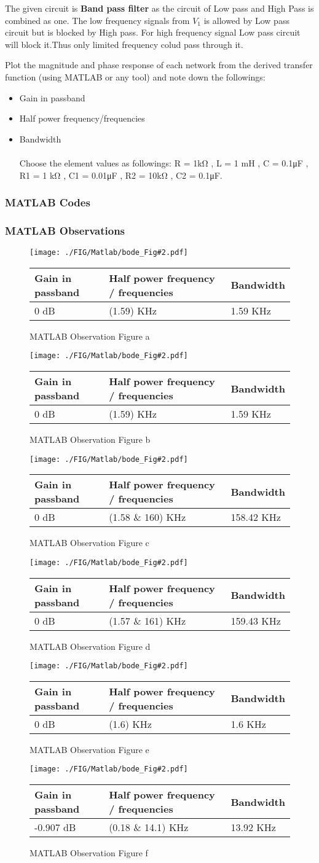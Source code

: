 \documentclass[a4paper,11pt]{article}
\newcommand{\mobs}[5]{
    \begin{figure}[H]
        \centering
        \texttt{[image: ./FIG/Matlab/bode\_Fig\#2.pdf]}
        \begin{tabular}[H]{| m{12em}| m{20em}|m{8em}|}
            \hline
            \rowcolor[rgb]{0.569,0.647,0.947} \textbf{Gain in passband} & \textbf{Half power frequency / frequencies} & \textbf{Bandwidth} \\ \hline
            #3 dB                                                       & (#4) KHz                                    & #5 KHz             \\  \hline
        \end{tabular}
        \caption{MATLAB Observation Figure #2}
    \end{figure}
   
}
\begin{document}
The given circuit is \textbf{Band pass filter} as the  circuit of Low pass and High Pass is combined as one. The low frequency signals from $V_1$ is allowed by Low pass circuit but is blocked by High pass. For high frequency signal Low pass circuit will block it.Thus only limited frequency colud pass through it.

\pagebreak
\begin{Q}
    {
        Plot the magnitude and phase response of each network from the derived transfer function (using MATLAB or any tool) and note down the followings:
        \begin{itemize}
            \item Gain in passband
            \item Half power frequency/frequencies
            \item Bandwidth\\\\
                  Choose the element values as followings:
                  R = 1\si{\kilo\ohm}  , L = 1 \si{\milli\henry} ,
                  C = 0.1\si{\micro\farad} ,
                  R1 = 1 \si{\kilo\ohm} ,
                  C1 = 0.01\si{\micro\farad} ,
                  R2 = 10\si{\kilo\ohm} ,
                  C2 = 0.1\si{\micro\farad}.
        \end{itemize}}
\end{Q}

\subsubsection{MATLAB Codes}


\subsubsection{MATLAB Observations}

\mobs{0.85}{a}{0}{1.59}{1.59}%
\mobs{0.85}{b}{0}{1.59}{1.59}%
\mobs{0.85}{c}{0}{1.58 \& 160}{158.42}%
\mobs{0.85}{d}{0}{1.57 \& 161}{159.43}%
\mobs{0.85}{e}{0}{1.6}{1.6}%
\mobs{0.85}{f}{-0.907}{0.18 \& 14.1}{13.92}%
\end{document}

